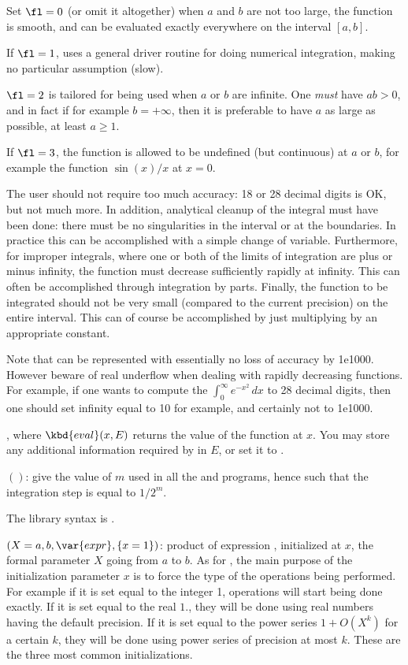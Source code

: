 Set $\fl=0$ (or omit it altogether) when $a$ and $b$ are not too large, the
function is smooth, and can be evaluated exactly everywhere on the interval
$[a,b]$.

If $\fl=1$, uses a general driver routine for doing numerical integration,
making no particular assumption (slow).

$\fl=2$ is tailored for being used when $a$ or $b$ are infinite. One
\emph{must} have $ab>0$, and in fact if for example $b=+\infty$, then it is
preferable to have $a$ as large as possible, at least $a\ge1$.

If $\fl=3$, the function is allowed to be undefined (but continuous) at $a$
or $b$, for example the function $\sin(x)/x$ at $x=0$.

The user should not require too much accuracy: 18 or 28 decimal digits is OK,
but not much more. In addition, analytical cleanup of the integral must have
been done: there must be no singularities in the interval or at the
boundaries. In practice this can be accomplished with a simple change of
variable. Furthermore, for improper integrals, where one or both of the
limits of integration are plus or minus infinity, the function must decrease
sufficiently rapidly at infinity. This can often be accomplished through
integration by parts. Finally, the function to be integrated should not be
very small (compared to the current precision) on the entire interval. This
can of course be accomplished by just multiplying by an appropriate constant.

Note that  can be represented with essentially no loss of
accuracy by 1e1000. However beware of real underflow when dealing with
rapidly decreasing functions. For example, if one wants to compute the
$\int_0^\infty e^{-x^2}\,dx$ to 28 decimal digits, then one should set
infinity equal to 10 for example, and certainly not to 1e1000.

,
where $\kbd{eval}(x, E)$ returns the value of the function at $x$.
You may store any additional information required by  in $E$, or set
it to .

$()$: \label{se:intnumstep}give the value of $m$ used in all the
 and  programs, hence such that the integration
step is equal to $1/2^m$.

The library syntax is .

$(X=a,b,\var{expr},\{x=1\})$: \label{se:prod}product of expression
, initialized at $x$, the formal parameter $X$ going from $a$ to
$b$. As for , the main purpose of the initialization parameter $x$
is to force the type of the operations being performed. For example if it is
set equal to the integer 1, operations will start being done exactly. If it
is set equal to the real $1.$, they will be done using real numbers having
the default precision. If it is set equal to the power series $1+O(X^k)$ for
a certain $k$, they will be done using power series of precision at most $k$.
These are the three most common initializations.

